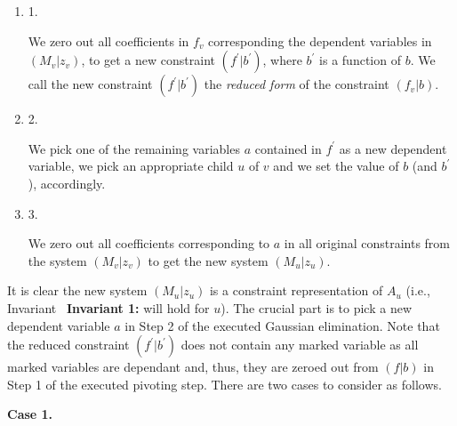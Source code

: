 \begin{enumerate}


\item[] 
1. 


We zero out all coefficients in $f_{v}$ corresponding the dependent variables in $(M_{v}|z_{v})$, to get a new constraint $(f^{\prime}|b^{\prime})$, where $b^{\prime}$ is a function of $b$. We call the new constraint $(f^{\prime}|b^{\prime})$ the \emph{reduced form} of the constraint $(f_{v}|b)$.\par





\item[] 
2. 


We pick one of the remaining variables $a$ contained in $f^{\prime}$ as a new dependent variable, we pick an appropriate child $u$ of $v$ and we set the value of $b$ (and $b^{\prime}$), accordingly.\par





\item[] 
3. 


We zero out all coefficients corresponding to $a$ in all original constraints from the system $(M_{v}|z_{v})$ to get the new system $(M_{u}|z_{u})$.\par





\end{enumerate}


It is clear the new system $(M_{u}|z_{u})$ is a constraint representation of $A_{u}$ (i.e., Invariant \textbf{ Invariant 1:} will hold for $u$).
The crucial part is to pick a new dependent variable $a$ in Step 2 of the executed Gaussian elimination.
Note that the reduced constraint $(f^{\prime}|b^{\prime})$ does not contain any marked variable as all marked variables are dependant and, thus, they are zeroed out from $(f|b)$ in Step 1 of the executed pivoting step.
There are two cases to consider as follows.\par




\par\medskip\noindent\textbf{Case 1.}\par




